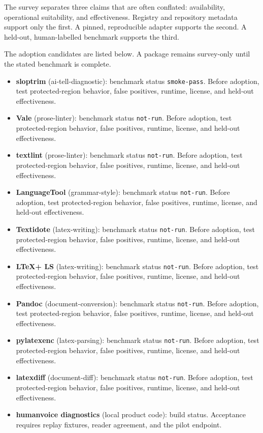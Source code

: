 \documentclass[11pt]{article}
\providecommand{\tightlist}{\setlength{\itemsep}{0pt}\setlength{\parskip}{0pt}}
\begin{document}
The survey separates three claims that are often conflated: availability, operational suitability, and effectiveness. Registry and repository metadata support only the first. A pinned, reproducible adapter supports the second. A held-out, human-labelled benchmark supports the third.

The adoption candidates are listed below. A package remains survey-only until the stated benchmark is complete.

\begin{itemize}
\tightlist
\item
  \textbf{sloptrim} (ai-tell-diagnostic): benchmark status \texttt{smoke-pass}. Before adoption, test protected-region behavior, false positives, runtime, license, and held-out effectiveness.
\item
  \textbf{Vale} (prose-linter): benchmark status \texttt{not-run}. Before adoption, test protected-region behavior, false positives, runtime, license, and held-out effectiveness.
\item
  \textbf{textlint} (prose-linter): benchmark status \texttt{not-run}. Before adoption, test protected-region behavior, false positives, runtime, license, and held-out effectiveness.
\item
  \textbf{LanguageTool} (grammar-style): benchmark status \texttt{not-run}. Before adoption, test protected-region behavior, false positives, runtime, license, and held-out effectiveness.
\item
  \textbf{Textidote} (latex-writing): benchmark status \texttt{not-run}. Before adoption, test protected-region behavior, false positives, runtime, license, and held-out effectiveness.
\item
  \textbf{LTeX+ LS} (latex-writing): benchmark status \texttt{not-run}. Before adoption, test protected-region behavior, false positives, runtime, license, and held-out effectiveness.
\item
  \textbf{Pandoc} (document-conversion): benchmark status \texttt{not-run}. Before adoption, test protected-region behavior, false positives, runtime, license, and held-out effectiveness.
\item
  \textbf{pylatexenc} (latex-parsing): benchmark status \texttt{not-run}. Before adoption, test protected-region behavior, false positives, runtime, license, and held-out effectiveness.
\item
  \textbf{latexdiff} (document-diff): benchmark status \texttt{not-run}. Before adoption, test protected-region behavior, false positives, runtime, license, and held-out effectiveness.
\item
  \textbf{humanvoice diagnostics} (local product code): build status. Acceptance requires replay fixtures, reader agreement, and the pilot endpoint.
\end{itemize}
\end{document}
